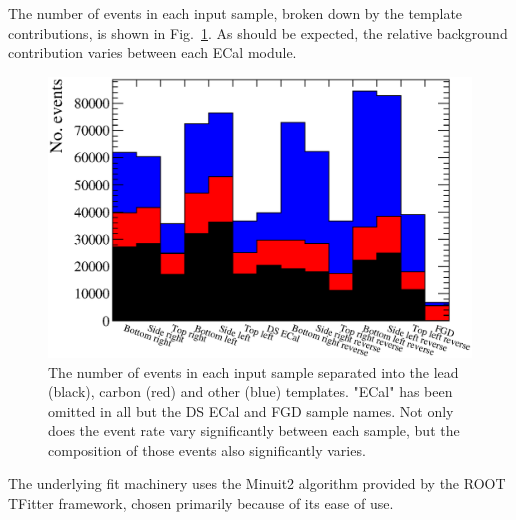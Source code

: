 The number of events in each input sample, broken down by the template contributions, is shown in Fig.~\ref{fig:NominalMCTemplates}.  As should be expected, the relative background contribution varies between each ECal module.
\begin{figure}
  \centering
  \includegraphics[width=12cm]{images/measurement/rate_fit/MC_Templates_Nominal.eps}
  \caption{The number of events in each input sample separated into the lead (black), carbon (red) and other (blue) templates.  "ECal" has been omitted in all but the DS ECal and FGD sample names.  Not only does the event rate vary significantly between each sample, but the composition of those events also significantly varies.}
  \label{fig:NominalMCTemplates}
\end{figure}
\newline
\newline
The underlying fit machinery uses the Minuit2 algorithm provided by the ROOT TFitter framework, chosen primarily because of its ease of use.


